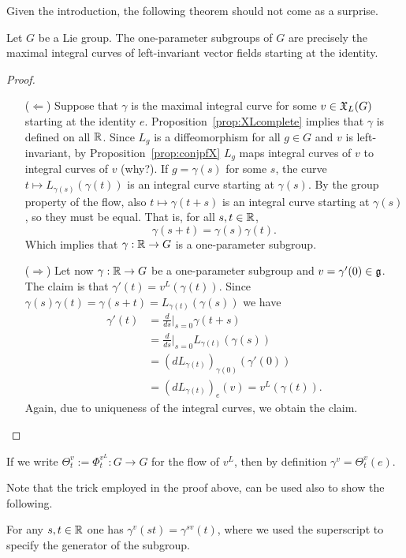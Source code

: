 Given the introduction, the following theorem should not come as a surprise.
\begin{theorem}
  Let $G$ be a Lie group.
  The one-parameter subgroups of $G$ are precisely the maximal integral curves of left-invariant vector fields starting at the identity.
\end{theorem}
\begin{proof}
  \begin{itemize}
    \item[($\Longleftarrow$)]
    Suppose that $\gamma$ is the maximal integral curve for some $v\in\mathfrak{X}_L(G)$ starting at the identity $e$. 
    Proposition~\ref{prop:XLcomplete} implies that $\gamma$ is defined on all $\mathbb{R}$. Since $L_g$ is a diffeomorphism for all $g\in G$ and $v$ is left-invariant, by Proposition~\ref{prop:conjpfX} $L_g$ maps integral curves of $v$ to integral curves of $v$ (why?).
    If $g=\gamma(s)$ for some $s$, the curve $t\mapsto L_{\gamma(s)}(\gamma(t))$ is an integral curve starting at $\gamma(s)$.
    By the group property of the flow, also $t\mapsto \gamma(t+s)$ is an integral curve starting at $\gamma(s)$, so they must be equal.
    That is, for all $s,t\in \mathbb{R}$,
    \begin{equation}
      \gamma(s+t) = \gamma(s)\gamma(t).
    \end{equation}
    Which implies that $\gamma:\mathbb{R}\to G$ is a one-parameter subgroup.
    \item[($\Longrightarrow$)] Let now $\gamma:\mathbb{R}\to G$ be a one-parameter subgroup and $v = \gamma'(0)\in \mathfrak{g}$.
    The claim is that $\gamma'(t) = v^L(\gamma(t))$.
    Since $\gamma(s)\gamma(t) = \gamma(s+t) = L_{\gamma(t)}(\gamma(s))$ we have
    \begin{align}
      \gamma'(t) &= \frac{d}{ds}\Big|_{s=0} \gamma(t+s) \\
      &= \frac{d}{ds}\Big|_{s=0} L_{\gamma(t)}(\gamma(s)) \\
      &= (dL_{\gamma(t)})_{\gamma(0)}(\gamma'(0)) \\
      &= (dL_{\gamma(t)})_{e}(v)
      = v^L(\gamma(t)).
    \end{align}
    Again, due to uniqueness of the integral curves, we obtain the claim.
  \end{itemize}
\end{proof}

If we write $\Theta_t^v:=\Phi^{v^L}_t:G\to G$ for the flow of $v^L$, then by definition $\gamma^v = \Theta_t^v(e)$.

Note that the trick employed in the proof above, can be used also to show the following.
\begin{lemma}
  For any $s,t\in\mathbb{R}$ one has $\gamma^v(st) = \gamma^{sv}(t)$, where we used the superscript to specify the generator of the subgroup.
\end{lemma}

